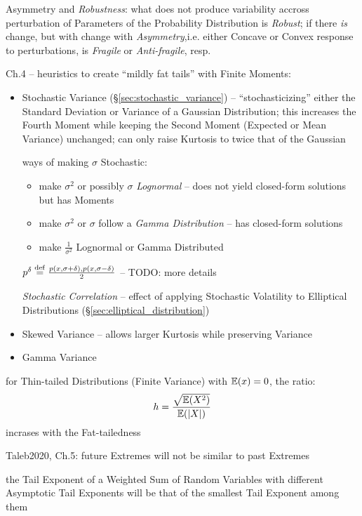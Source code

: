 Asymmetry and \emph{Robustness}: what does not produce variability accross
perturbation of Parameters of the Probability Distribution is \emph{Robust}; if
there \emph{is} change, but with change with \emph{Asymmetry},i.e. either
Concave or Convex response to perturbations, is \emph{Fragile} or
\emph{Anti-fragile}, resp.

Ch.4 -- heuristics to create ``mildly fat tails'' with Finite Moments:

\begin{itemize}
  \item Stochastic Variance (\S\ref{sec:stochastic_variance}) --
    ``stochasticizing'' either the Standard Deviation or Variance of a Gaussian
    Distribution; this increases the Fourth Moment while keeping the Second
    Moment (Expected or Mean Variance) unchanged; can only raise Kurtosis to
    twice that of the Gaussian

    ways of making $\sigma$ Stochastic:
    \begin{itemize}
      \item make $\sigma^2$ or possibly $\sigma$ \emph{Lognormal} -- does not
        yield closed-form solutions but has Moments
      \item make $\sigma^2$ or $\sigma$ follow a \emph{Gamma Distribution}
        -- has closed-form solutions
      \item make $\frac{1}{\sigma^2}$ Lognormal or Gamma Distributed
    \end{itemize}

    $p^\delta \stackrel{\mathrm{def}}= \frac{p(x, \sigma + \delta), p(x, \sigma - \delta)}{2}$
    -- TODO: more details

    \emph{Stochastic Correlation} -- effect of applying Stochastic Volatility to
    Elliptical Distributions (\S\ref{sec:elliptical_distribution})
  \item Skewed Variance -- allows larger Kurtosis while preserving Variance
  \item Gamma Variance
\end{itemize}

for Thin-tailed Distributions (Finite Variance) with $\mathbb{E}(x) = 0$, the
ratio:
\[
  h = \frac{\sqrt{\mathbb{E}(X^2)}}{\mathbb{E}(|X|)}
\]
incrases with the Fat-tailedness

Taleb2020, Ch.5: future Extremes will not be similar to past Extremes

the Tail Exponent of a Weighted Sum of Random Variables with different
Asymptotic Tail Exponents will be that of the smallest Tail Exponent among them

